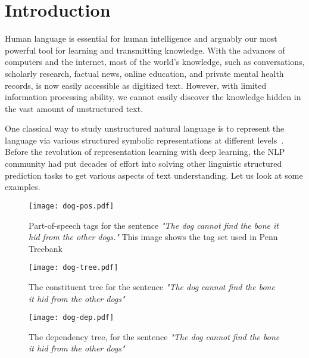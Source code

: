 
\chapter{Introduction}
\label{chap:intro}

Human language is essential for human intelligence and arguably our
most powerful tool for learning and transmitting knowledge. With the
advances of computers and the internet, most of the world's knowledge,
such as conversations, scholarly research, factual news, online
education, and private mental health records, is now easily accessible
as digitized text. However, with limited information processing
ability, we cannot easily discover the knowledge hidden in the vast
amount of unstructured text.

One classical way to study unstructured natural language is to
represent the language via various structured symbolic representations
at different levels~\citep{smith2011linguistic}. Before the revolution
of representation learning with deep learning, the NLP community had
put decades of effort into solving other linguistic structured
prediction tasks to get various aspects of text understanding. Let us
look at some examples.

\begin{figure}[!th]
\centering
\texttt{[image: dog-pos.pdf]}
\caption{\label{fig:intro:dog-pos}Part-of-speech tags for the sentence
  \textit{"The dog cannot find the bone it hid from the other dogs."}
  This image shows the tag set used in Penn
  Treebank~\cite{marcus-etal-1994-penn} }
\end{figure}

\begin{figure}[!th]
\centering
\texttt{[image: dog-tree.pdf]}
\caption{\label{fig:intro:dog-tree}The constituent tree for the sentence \textit{"The dog cannot find the bone it
    hid from the other dogs"}}
\end{figure}

\begin{figure}[!th]
\centering
\texttt{[image: dog-dep.pdf]}
\caption{\label{fig:intro:dog-dep}The dependency tree, for the
  sentence \textit{"The dog cannot find the bone it hid from the other
    dogs"}}
\end{figure}

